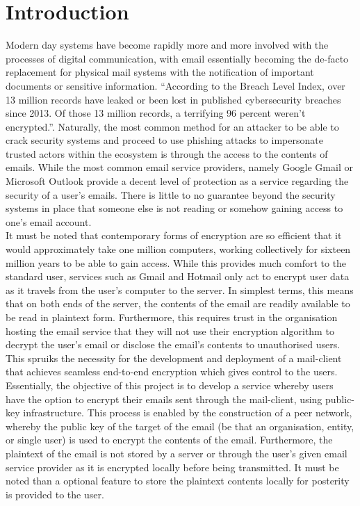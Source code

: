 \documentclass[12pt]{article}
\begin{document}
	\section{Introduction}
		Modern day systems have become rapidly more and more involved with the processes of digital communication, with email essentially becoming the de-facto replacement for physical mail systems with the notification of important documents or sensitive information. ``According to the Breach Level Index, over 13 million records have leaked or been lost in published cybersecurity breaches since 2013. Of those 13 million records, a terrifying 96 percent weren't encrypted.''\cite{zapierSecure}. Naturally, the most common method for an attacker to be able to crack security systems and proceed to use phishing attacks to impersonate trusted actors within the ecosystem is through the access to the contents of emails. While the most common email service providers, namely Google Gmail or Microsoft Outlook provide a decent level of protection as a service regarding the security of a user's emails. There is little to no guarantee beyond the security systems in place that someone else is not reading or somehow gaining access to one's email account.\\
		\newline
		\noindent It must be noted that contemporary forms of encryption are so efficient that it would approximately take one million computers, working collectively for sixteen million years\cite{encryptionStrength} to be able to gain access. While this provides much comfort to the standard user, services such as Gmail and Hotmail only act to encrypt user data as it travels from the user's computer to the server. In simplest terms, this means that on both ends of the server, the contents of the email are readily available to be read in plaintext form. Furthermore, this requires trust in the organisation hosting the email service that they will not use their encryption algorithm to decrypt the user's email or disclose the email's contents to unauthorised users. This spruiks the necessity for the development and deployment of a mail-client that achieves seamless end-to-end encryption which gives control to the users. Essentially, the objective of this project is to develop a service whereby users have the option to encrypt their emails sent through the mail-client, using public-key infrastructure. This process is enabled by the construction of a peer network, whereby the public key of the target of the email (be that an organisation, entity, or single user) is used to encrypt the contents of the email. Furthermore, the plaintext of the email is not stored by a server or through the user's given email service provider as it is encrypted locally before being transmitted. It must be noted than a optional feature to store the plaintext contents locally for posterity is provided to the user.
\end{document}

